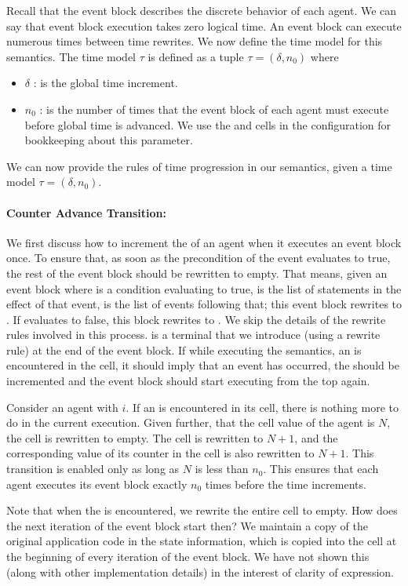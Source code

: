  Recall that the event block describes the discrete behavior of each agent. We can say that event block execution takes zero logical time. An event block can execute numerous times between time rewrites. We now define the time model for this semantics. The time model $\tau$ is defined as a tuple $\tau = (\delta, n_0)$ where 
 \begin{itemize}
 \item $\delta$ : is the global time increment. 
 \item $n_0$ : is the number of times that the event block of each agent must execute before global time is advanced. We use the  and  cells in the configuration for bookkeeping about this parameter. 
 \end{itemize}
We can now provide the rules of time progression in our semantics, given a time model $\tau = (\delta,n_0)$. 

\paragraph{Counter Advance Transition:}
We first discuss how to increment the  of an agent when it executes an event block once. To ensure that, as soon as the precondition of the event evaluates to true, the rest of the event block should be rewritten to empty. That means, given an event block  where  is a condition evaluating to true,  is the list of statements in the effect of that event,  is the list of events following that; this event block rewrites to . If  evaluates to false, this block rewrites to . We skip the details of the rewrite rules involved in this process. 
 is a terminal that we introduce (using a rewrite rule) at the end of the event block. If while executing the semantics, an  is encountered in the  cell, it should imply that an event has occurred, the  should be incremented and  the event block should start executing from the top again.
 
 Consider an agent with  $i$. If an  is encountered in its  cell, there is nothing more to do in the current execution. Given further, that the  cell value of the agent is $N$, the  cell is rewritten to empty. The  cell is rewritten to $N+1$, and the corresponding value of its counter in the  cell is also rewritten to $N+1$. This transition is enabled only as long as $N$ is less than $n_0$. This ensures that each agent executes its event block exactly $n_0$ times before the time increments. 
\vspace{-1mm}

Note that when the  is encountered, we rewrite the entire  cell to empty. How does the next iteration of the event block start then? We maintain a copy of the original application code in the state information, which is copied into the  cell at the beginning of every iteration of the event block. We have not shown this (along with other implementation details) in the interest of clarity of expression. 
